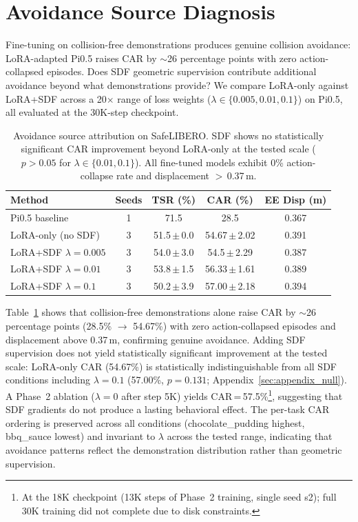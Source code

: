 \section{Avoidance Source Diagnosis}\label{sec:avoidance_source}

Fine-tuning on collision-free demonstrations produces genuine collision avoidance: LoRA-adapted Pi0.5 raises CAR by ${\sim}$26 percentage points with zero action-collapsed episodes. Does SDF geometric supervision contribute additional avoidance beyond what demonstrations provide? We compare LoRA-only against LoRA+SDF across a 20$\times$ range of loss weights ($\lambda \in \{0.005, 0.01, 0.1\}$) on Pi0.5, all evaluated at the 30K-step checkpoint.

\begin{table}[t]
\centering
\caption{Avoidance source attribution on SafeLIBERO. SDF shows no statistically significant CAR improvement beyond LoRA-only at the tested scale ($p > 0.05$ for $\lambda \in \{0.01, 0.1\}$). All fine-tuned models exhibit 0\% action-collapse rate and displacement $>$\,0.37\,m.}
\label{tab:avoidance_source}
\vspace{2pt}
\small
\begin{tabular}{lcccc}
\toprule
Method & Seeds & TSR (\%) & CAR (\%) & EE Disp (m) \\
\midrule
Pi0.5 baseline & 1 & 71.5 & 28.5 & 0.367 \\
\midrule
LoRA-only (no SDF) & 3 & 51.5\,$\pm$\,0.0 & 54.67\,$\pm$\,2.02 & 0.391 \\
LoRA+SDF $\lambda{=}0.005$ & 3 & 54.0\,$\pm$\,3.0 & 54.5\,$\pm$\,2.29 & 0.387 \\
LoRA+SDF $\lambda{=}0.01$ & 3 & 53.8\,$\pm$\,1.5 & 56.33\,$\pm$\,1.61 & 0.389 \\
LoRA+SDF $\lambda{=}0.1$ & 3 & 50.2\,$\pm$\,3.9 & 57.00\,$\pm$\,2.18 & 0.394 \\
\bottomrule
\end{tabular}
\vspace{1pt}
\end{table}

Table~\ref{tab:avoidance_source} shows that collision-free demonstrations alone raise CAR by ${\sim}$26 percentage points (28.5\% $\to$ 54.67\%) with zero action-collapsed episodes and displacement above 0.37\,m, confirming genuine avoidance. Adding SDF supervision does not yield statistically significant improvement at the tested scale: LoRA-only CAR (54.67\%) is statistically indistinguishable from all SDF conditions including $\lambda = 0.1$ (57.00\%, $p = 0.131$; Appendix~\ref{sec:appendix_null}). A Phase~2 ablation ($\lambda = 0$ after step 5K) yields CAR\,=\,57.5\%\footnote{At the 18K checkpoint (13K steps of Phase~2 training, single seed s2); full 30K training did not complete due to disk constraints.}, suggesting that SDF gradients do not produce a lasting behavioral effect. The per-task CAR ordering is preserved across all conditions (chocolate\_pudding highest, bbq\_sauce lowest) and invariant to $\lambda$ across the tested range, indicating that avoidance patterns reflect the demonstration distribution rather than geometric supervision.

